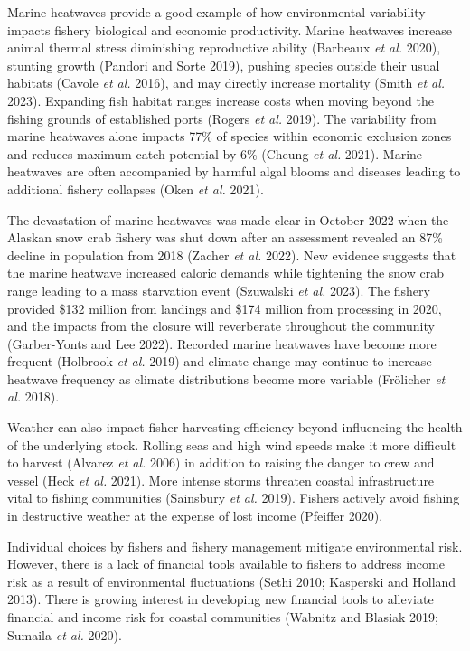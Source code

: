 \documentclass[
  letterpaper,
  DIV=11,
  numbers=noendperiod]{scrartcl}
\theoremstyle{plain}
\theoremstyle{plain}
\theoremstyle{remark}
\begin{document}
Marine heatwaves provide a good example of how environmental variability
impacts fishery biological and economic productivity. Marine heatwaves
increase animal thermal stress diminishing reproductive ability
(Barbeaux \emph{et al.} 2020), stunting growth (Pandori and Sorte 2019),
pushing species outside their usual habitats (Cavole \emph{et al.}
2016), and may directly increase mortality (Smith \emph{et al.} 2023).
Expanding fish habitat ranges increase costs when moving beyond the
fishing grounds of established ports (Rogers \emph{et al.} 2019). The
variability from marine heatwaves alone impacts 77\% of species within
economic exclusion zones and reduces maximum catch potential by 6\%
(Cheung \emph{et al.} 2021). Marine heatwaves are often accompanied by
harmful algal blooms and diseases leading to additional fishery
collapses (Oken \emph{et al.} 2021).

The devastation of marine heatwaves was made clear in October 2022 when
the Alaskan snow crab fishery was shut down after an assessment revealed
an 87\% decline in population from 2018 (Zacher \emph{et al.} 2022). New
evidence suggests that the marine heatwave increased caloric demands
while tightening the snow crab range leading to a mass starvation event
(Szuwalski \emph{et al.} 2023). The fishery provided \$132 million from
landings and \$174 million from processing in 2020, and the impacts from
the closure will reverberate throughout the community (Garber-Yonts and
Lee 2022). Recorded marine heatwaves have become more frequent (Holbrook
\emph{et al.} 2019) and climate change may continue to increase heatwave
frequency as climate distributions become more variable (Frölicher
\emph{et al.} 2018).

Weather can also impact fisher harvesting efficiency beyond influencing
the health of the underlying stock. Rolling seas and high wind speeds
make it more difficult to harvest (Alvarez \emph{et al.} 2006) in
addition to raising the danger to crew and vessel (Heck \emph{et al.}
2021). More intense storms threaten coastal infrastructure vital to
fishing communities (Sainsbury \emph{et al.} 2019). Fishers actively
avoid fishing in destructive weather at the expense of lost income
(Pfeiffer 2020).

Individual choices by fishers and fishery management mitigate
environmental risk. However, there is a lack of financial tools
available to fishers to address income risk as a result of environmental
fluctuations (Sethi 2010; Kasperski and Holland 2013). There is growing
interest in developing new financial tools to alleviate financial and
income risk for coastal communities (Wabnitz and Blasiak 2019; Sumaila
\emph{et al.} 2020).
\end{document}
